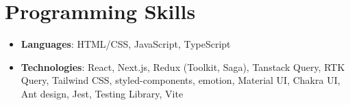 \documentclass[letterpaper,11pt]{article}
\newcommand{\resumeSubHeadingListStart}{\begin{itemize}[leftmargin=*]}
\newcommand{\resumeSubHeadingListEnd}{\end{itemize}}
\begin{document}
    
    \section{Programming Skills}
    \resumeSubHeadingListStart
      
        \item{
          \textbf{Languages}{: HTML/CSS, JavaScript, TypeScript}
        }
      
        \item{
          \textbf{Technologies}{: React, Next.js, Redux (Toolkit, Saga), Tanstack Query, RTK Query, Tailwind CSS, styled-components, emotion, Material UI, Chakra UI, Ant design, Jest, Testing Library, Vite}
        }
      
    \resumeSubHeadingListEnd
  
    
\end{document}
